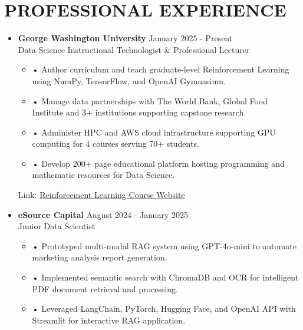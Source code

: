 \documentclass[a4paper,9pt]{extarticle}
\begin{document}

\section*{PROFESSIONAL EXPERIENCE}

\begin{itemize}[leftmargin=0.4cm, label={}]
    \item \textbf{George Washington University} \hfill January 2025 - Present \\
    Data Science Instructional Technologist \& Professional Lecturer
    \vspace{-0.1cm}
    \begin{itemize}[leftmargin=0.3cm, label={}]
    \item \small{•} \normalsize{Author curriculum and teach graduate-level Reinforcement Learning using NumPy, TensorFlow, and OpenAI Gymnasium.}
    \item \small{•} \normalsize{Manage data partnerships with The World Bank, Global Food Institute and 3+ institutions supporting capstone research.}
    \item \small{•} \normalsize{Administer HPC and AWS cloud infrastructure supporting GPU computing for 4 courses serving 70+ students.}
    \item \small{•} \normalsize{Develop 200+ page educational platform hosting programming and mathematic resources for Data Science.} 
    \end{itemize}
    Link: \href{https://twallett.com/courses/reinforcement-learning/}{Reinforcement Learning Course Website}
\end{itemize}

\noindent
\begin{itemize}[leftmargin=0.4cm, label={}]
    \item \textbf{eSource Capital} \hfill August 2024 - January 2025 \\
    Junior Data Scientist 
    \vspace{-0.1cm}
    \begin{itemize}[leftmargin=0.3cm, label={}]
    \item \small{•} \normalsize{Prototyped multi-modal RAG system using GPT-4o-mini to automate marketing analysis report generation.}
    \item \small{•} \normalsize{Implemented semantic search with ChromaDB and OCR for intelligent PDF document retrieval and processing.}
    \item \small{•} \normalsize{Leveraged LangChain, PyTorch, Hugging Face, and OpenAI API with Streamlit for interactive RAG application.}
\end{itemize}
\end{itemize}
\end{document}
